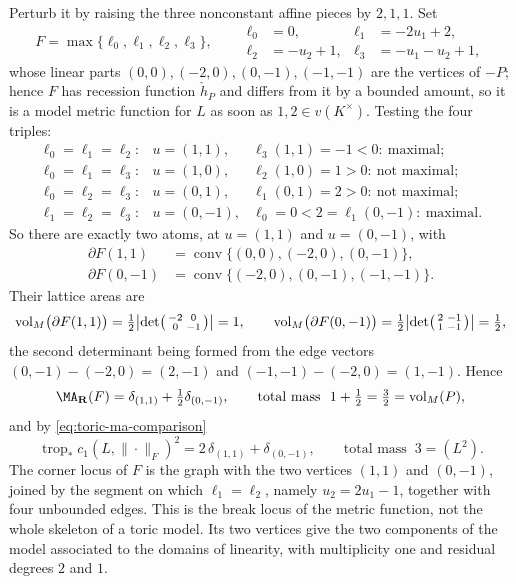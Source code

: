 \begin{example}
Perturb it by raising the three nonconstant affine pieces by $2,1,1$.
Set
\[
 F=\max\{\ell_0,\ell_1,\ell_2,\ell_3\},\qquad
 \begin{aligned}
  \ell_0&=0,           &\ell_1&=-2u_1+2,\\
  \ell_2&=-u_2+1,      &\ell_3&=-u_1-u_2+1 ,
 \end{aligned}
\]
whose linear parts $(0,0),(-2,0),(0,-1),(-1,-1)$ are the vertices of $-P$;
hence $F$ has recession function $\check h_P$ and differs from it by a
bounded amount, so it is a model metric function for $L$ as soon as
$1,2\in v(K^\times)$.  Testing the four triples:
\[
\begin{array}{lll}
 \ell_0=\ell_1=\ell_2:& u=(1,1),
  &\ell_3(1,1)=-1<0:\ \text{maximal};\\
 \ell_0=\ell_1=\ell_3:& u=(1,0),
  &\ell_2(1,0)=1>0:\ \text{not maximal};\\
 \ell_0=\ell_2=\ell_3:& u=(0,1),
  &\ell_1(0,1)=2>0:\ \text{not maximal};\\
 \ell_1=\ell_2=\ell_3:& u=(0,-1),
  &\ell_0=0<2=\ell_1(0,-1):\ \text{maximal}.
\end{array}
\]
So there are exactly two atoms, at $u=(1,1)$ and $u=(0,-1)$, with
\[
 \begin{aligned}
 \partial F(1,1)
   &=\operatorname{conv}\{(0,0),(-2,0),(0,-1)\},\\
 \partial F(0,-1)
   &=\operatorname{conv}\{(-2,0),(0,-1),(-1,-1)\} .
 \end{aligned}
\]
Their lattice areas are
\[
 \operatorname{vol}_M\bigl(\partial F(1,1)\bigr)
 =\tfrac12\bigl|\det\begin{psmallmatrix}-2&0\\0&-1\end{psmallmatrix}\bigr|
 =1,
 \qquad
 \operatorname{vol}_M\bigl(\partial F(0,-1)\bigr)
 =\tfrac12\bigl|\det\begin{psmallmatrix}2&-1\\1&-1\end{psmallmatrix}\bigr|
 =\tfrac12 ,
\]
the second determinant being formed from the edge vectors
$(0,-1)-(-2,0)=(2,-1)$ and $(-1,-1)-(-2,0)=(1,-1)$.  Hence
\[
 \MA_{\mathbf R}(F)=\delta_{(1,1)}+\tfrac12\delta_{(0,-1)},
 \qquad
 \text{total mass }\ 1+\tfrac12=\tfrac32=\operatorname{vol}_M(P) ,
\]
and by \eqref{eq:toric-ma-comparison}
\[
 \operatorname{trop}_*c_1(L,\|\cdot\|_F)^2
 =2\,\delta_{(1,1)}+\delta_{(0,-1)} ,
 \qquad
 \text{total mass }\ 3=(L^2) .
\]
The corner locus of $F$ is the graph with the two vertices $(1,1)$ and
$(0,-1)$, joined by the segment on which $\ell_1=\ell_2$, namely
$u_2=2u_1-1$, together with four unbounded edges.  This is the break locus
of the metric function, not the whole skeleton of a toric model.  Its two
vertices give the two components of the model associated to the domains of
linearity, with multiplicity one and residual degrees $2$ and $1$.
\end{example}

